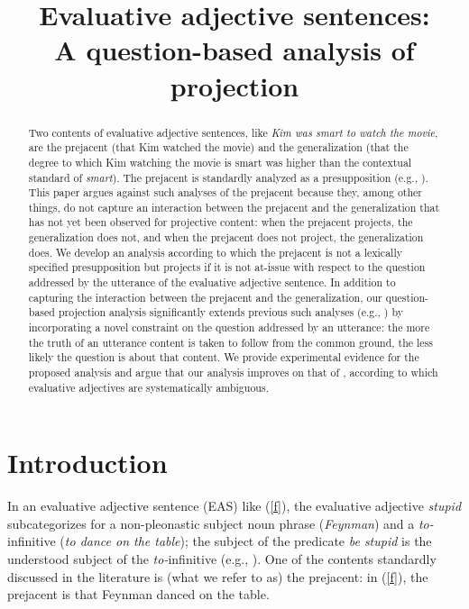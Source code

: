 \documentclass[11pt,fleqn]{article}
\title{Evaluative adjective sentences: \\ A question-based analysis of projection}
\author{}
\newcommand{\6}{\mbox{$[\hspace*{-.6mm}[$}}
\newcommand{\9}{\mbox{$]\hspace*{-.6mm}]$}}
\begin{document}
\maketitle


\begin{abstract}

Two contents of evaluative adjective sentences, like {\em Kim was smart to watch the movie}, are the prejacent (that Kim watched the movie) and the generalization (that the degree to which Kim watching the movie is smart was higher than the contextual standard of {\em smart}). The prejacent is standardly analyzed as a presupposition
(e.g., \citealt{norrick78,barker02,oshima09b,kertz2010}). This paper argues against such analyses of the prejacent because they, among other things, do not capture an interaction between the prejacent and the generalization that has not yet been observed for projective content: when the prejacent projects, the generalization does not, and when the prejacent does not project, the generalization does. We develop an analysis according to which the prejacent is not a lexically specified presupposition but projects if it is not at-issue with respect to the question addressed by the utterance of the evaluative adjective sentence. In addition to capturing the interaction between the prejacent and the generalization, our question-based projection analysis significantly extends previous such analyses (e.g., \citealt{beaver-clark08,best-question,brst-ar}) by incorporating a novel constraint on the question addressed by an utterance: the more the truth of an utterance content is taken to follow from the common ground, the less likely the question is about that content. We provide experimental evidence for the proposed analysis and argue that our analysis improves on that of \citealt{karttunen-etal2014}, according to which evaluative adjectives are systematically ambiguous. 

\end{abstract}


\section{Introduction}\label{s1}

In an evaluative adjective sentence (EAS) like (\ref{f}), the
evaluative adjective {\em stupid} subcategorizes for a non-pleonastic subject noun
phrase ({\em Feynman}) and a {\em to-}infinitive ({\em to
dance on the table}); the subject of the predicate {\em be stupid} is the understood subject of the {\em to-}infinitive (e.g., \citealt{wilkinson70, norrick78,barker02,kertz2010}). One of the contents standardly discussed in the literature is (what we refer to as) the prejacent: in (\ref{f}), the prejacent is that Feynman danced on the table.
\end{document}
